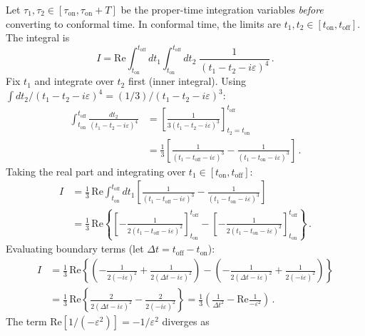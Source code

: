 \documentclass[12pt]{article}
\newcommand{\lb}{\left}
\newcommand{\rb}{\right}
\begin{document}
Let $\tau_{1},\tau_{2}\in[\tau_{\mathrm{on}},\tau_{\mathrm{on}}+T]$ be the proper-time
integration variables \emph{before} converting to conformal time.  In conformal time,
the limits are $t_{1},t_{2}\in[t_{\mathrm{on}}, t_{\mathrm{off}}]$.  The integral is
%
\begin{equation}
  I
  =
  \mathrm{Re}\int_{t_{\mathrm{on}}}^{t_{\mathrm{off}}}dt_{1}
  \int_{t_{\mathrm{on}}}^{t_{\mathrm{off}}}dt_{2}\;
  \frac{1}{(t_{1}-t_{2}-i\varepsilon)^{4}} \,.
\end{equation}
%
Fix $t_{1}$ and integrate over $t_{2}$ first (inner integral).
Using $\int dt_{2}/(t_{1}-t_{2}-i\varepsilon)^{4} = (1/3)/(t_{1}-t_{2}-i\varepsilon)^{3}$:
%
\begin{align}
  \int_{t_{\mathrm{on}}}^{t_{\mathrm{off}}}\frac{dt_{2}}{(t_{1}-t_{2}-i\varepsilon)^{4}}
  &=
  \lb[\frac{1}{3(t_{1}-t_{2}-i\varepsilon)^{3}}\rb]_{t_{2}=t_{\mathrm{on}}}^{t_{\mathrm{off}}} \nonumber\\
  &=
  \frac{1}{3}\lb[\frac{1}{(t_{1}-t_{\mathrm{off}}-i\varepsilon)^{3}}
                 - \frac{1}{(t_{1}-t_{\mathrm{on}}-i\varepsilon)^{3}}\rb] \,.
\end{align}
%
Taking the real part and integrating over $t_{1}\in[t_{\mathrm{on}}, t_{\mathrm{off}}]$:
%
\begin{align}
  I
  &=
  \frac{1}{3}\,\mathrm{Re}\int_{t_{\mathrm{on}}}^{t_{\mathrm{off}}}dt_{1}
  \lb[\frac{1}{(t_{1}-t_{\mathrm{off}}-i\varepsilon)^{3}}
      - \frac{1}{(t_{1}-t_{\mathrm{on}}-i\varepsilon)^{3}}\rb] \nonumber\\
  &=
  \frac{1}{3}\,\mathrm{Re}
  \lb\{
    \lb[-\frac{1}{2(t_{1}-t_{\mathrm{off}}-i\varepsilon)^{2}}\rb]_{t_{\mathrm{on}}}^{t_{\mathrm{off}}}
    -
    \lb[-\frac{1}{2(t_{1}-t_{\mathrm{on}}-i\varepsilon)^{2}}\rb]_{t_{\mathrm{on}}}^{t_{\mathrm{off}}}
  \rb\} \,.
\end{align}
%
Evaluating boundary terms (let $\Delta t = t_{\mathrm{off}}-t_{\mathrm{on}}$):
%
\begin{align}
  I
  &=
  \frac{1}{3}\,\mathrm{Re}\lb\{
    \lb(-\frac{1}{2(-i\varepsilon)^{2}}+\frac{1}{2(\Delta t-i\varepsilon)^{2}}\rb)
    -
    \lb(-\frac{1}{2(\Delta t-i\varepsilon)^{2}}+\frac{1}{2(-i\varepsilon)^{2}}\rb)
    \rb\} \nonumber \\
  &=
  \frac{1}{3}\,\mathrm{Re}\lb\{
    \frac{2}{2(\Delta t-i\varepsilon)^{2}} - \frac{2}{2(-i\varepsilon)^{2}}
  \rb\}
  =
  \frac{1}{3}\lb(\frac{1}{\Delta t^{2}} - \mathrm{Re}\frac{1}{-\varepsilon^{2}}\rb) \,.
\end{align}
%
The term $\mathrm{Re}[1/(-\varepsilon^{2})] = -1/\varepsilon^{2}$ diverges as
\end{document}
